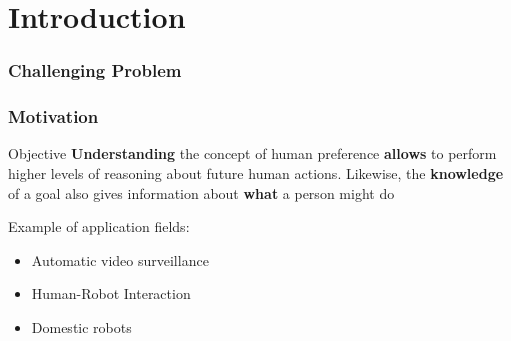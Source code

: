 \section{Introduction}

\begin{frame}
	\frametitle{Challenging Problem}
	
	\begin{center}
	\end{center}
\end{frame}

\begin{frame}
	\frametitle{Motivation}
	
	\vspace{0.2cm}
	
	\Large
	
	\begin{block}{Objective}
		\textbf{Understanding} the concept of human preference \textbf{allows} to perform higher levels
		of reasoning about future human actions. Likewise, the \textbf{knowledge} of a goal also gives
		information about \textbf{what} a person might do
	\end{block}
	
	\vspace{0.3cm}
	
	Example of application fields:
	\begin{itemize}
		\item Automatic video surveillance
		\item Human-Robot Interaction
		\item Domestic robots
	\end{itemize}
\end{frame}

